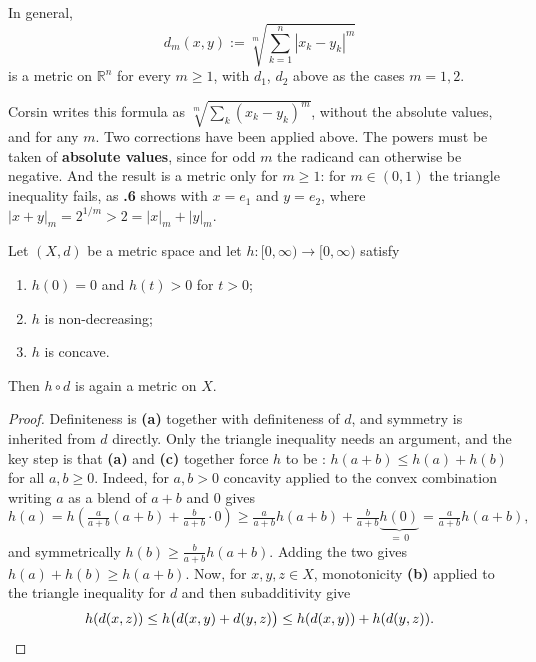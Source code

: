 In general,
\[
d_m(x,y) := \sqrt[m]{\sum_{k=1}^{n} |x_k - y_k|^m}
\]
is a metric on $\mathbb{R}^n$ for every $m \geq 1$, with $d_1$, $d_2$ above as the cases
$m = 1, 2$.

\begin{ainote}
Corsin writes this formula as $\sqrt[m]{\sum_k (x_k-y_k)^m}$, without the absolute values, and
for any $m$. Two corrections have been applied above. The powers must be taken of
\textbf{absolute values}, since for odd $m$ the radicand can otherwise be negative. And the
result is a metric only for $m \geq 1$: for $m \in (0,1)$ the triangle inequality fails, as
\textbf{.6} shows with $x = e_1$ and $y = e_2$, where
$|x+y|_m = 2^{1/m} > 2 = |x|_m + |y|_m$.
\end{ainote}

\begin{proposition}
\label{prop:concave_reshaping_metric}
Let $(X,d)$ be a metric space and let $h : [0,\infty) \to [0,\infty)$ satisfy
\begin{enumerate}[label=\textbf{(\alph*)}]
  \item $h(0) = 0$ and $h(t) > 0$ for $t > 0$;
  \item $h$ is non-decreasing;
  \item $h$ is concave.
\end{enumerate}
Then $h \circ d$ is again a metric on $X$.
\end{proposition}

\begin{proof}
Definiteness is \textbf{(a)} together with definiteness of $d$, and symmetry is inherited from
$d$ directly. Only the triangle inequality needs an argument, and the key step is that
\textbf{(a)} and \textbf{(c)} together force $h$ to be : $h(a+b) \leq h(a) +
h(b)$ for all $a,b \geq 0$. Indeed, for $a,b>0$ concavity applied to the convex combination
writing $a$ as a blend of $a+b$ and $0$ gives
\[h(a) = h\!\left(\tfrac{a}{a+b}(a+b) + \tfrac{b}{a+b}\cdot 0\right)
  \geq \tfrac{a}{a+b}h(a+b) + \tfrac{b}{a+b}\underbrace{h(0)}_{=\,0} = \tfrac{a}{a+b}h(a+b),\]
and symmetrically $h(b) \geq \tfrac{b}{a+b}h(a+b)$. Adding the two gives $h(a)+h(b) \geq h(a+b)$.
Now, for $x,y,z \in X$, monotonicity \textbf{(b)} applied to the triangle inequality for $d$ and
then subadditivity give
\[h(d(x,z)) \leq h\big(d(x,y)+d(y,z)\big) \leq h(d(x,y)) + h(d(y,z)). \qedhere\]
\end{proof}

